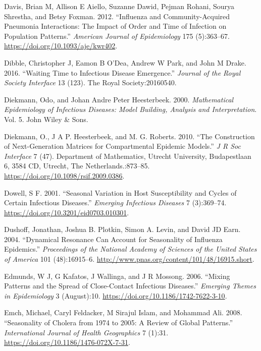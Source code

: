 \documentclass[]{book}
\theoremstyle{definition}
\theoremstyle{definition}
\theoremstyle{definition}
\theoremstyle{remark}
\begin{document}
\leavevmode\hypertarget{ref-davis12}{}%
Davis, Brian M, Allison E Aiello, Suzanne Dawid, Pejman Rohani, Sourya
Shrestha, and Betsy Foxman. 2012. ``Influenza and Community-Acquired
Pneumonia Interactions: The Impact of Order and Time of Infection on
Population Patterns.'' \emph{American Journal of Epidemiology} 175
(5):363--67. \url{https://doi.org/10.1093/aje/kwr402}.

\leavevmode\hypertarget{ref-dibble16}{}%
Dibble, Christopher J, Eamon B O'Dea, Andrew W Park, and John M Drake.
2016. ``Waiting Time to Infectious Disease Emergence.'' \emph{Journal of
the Royal Society Interface} 13 (123). The Royal Society:20160540.

\leavevmode\hypertarget{ref-diekmann00}{}%
Diekmann, Odo, and Johan Andre Peter Heesterbeek. 2000.
\emph{Mathematical Epidemiology of Infectious Diseases: Model Building,
Analysis and Interpretation}. Vol. 5. John Wiley \& Sons.

\leavevmode\hypertarget{ref-diekmann10}{}%
Diekmann, O., J A P. Heesterbeek, and M. G. Roberts. 2010. ``The
Construction of Next-Generation Matrices for Compartmental Epidemic
Models.'' \emph{J R Soc Interface} 7 (47). Department of Mathematics,
Utrecht University, Budapestlaan 6, 3584 CD, Utrecht, The
Netherlands.:873--85. \url{https://doi.org/10.1098/rsif.2009.0386}.

\leavevmode\hypertarget{ref-dowell01}{}%
Dowell, S F. 2001. ``Seasonal Variation in Host Susceptibility and
Cycles of Certain Infectious Diseases.'' \emph{Emerging Infectious
Diseases} 7 (3):369--74. \url{https://doi.org/10.3201/eid0703.010301}.

\leavevmode\hypertarget{ref-dushoff04}{}%
Dushoff, Jonathan, Joshua B. Plotkin, Simon A. Levin, and David JD Earn.
2004. ``Dynamical Resonance Can Account for Seasonality of Influenza
Epidemics.'' \emph{Proceedings of the National Academy of Sciences of
the United States of America} 101 (48):16915--6.
\url{http://www.pnas.org/content/101/48/16915.short}.

\leavevmode\hypertarget{ref-edmunds06}{}%
Edmunds, W J, G Kafatos, J Wallinga, and J R Mossong. 2006. ``Mixing
Patterns and the Spread of Close-Contact Infectious Diseases.''
\emph{Emerging Themes in Epidemiology} 3 (August):10.
\url{https://doi.org/10.1186/1742-7622-3-10}.

\leavevmode\hypertarget{ref-emch08}{}%
Emch, Michael, Caryl Feldacker, M Sirajul Islam, and Mohammad Ali. 2008.
``Seasonality of Cholera from 1974 to 2005: A Review of Global
Patterns.'' \emph{International Journal of Health Geographics} 7 (1):31.
\url{https://doi.org/10.1186/1476-072X-7-31}.
\end{document}
